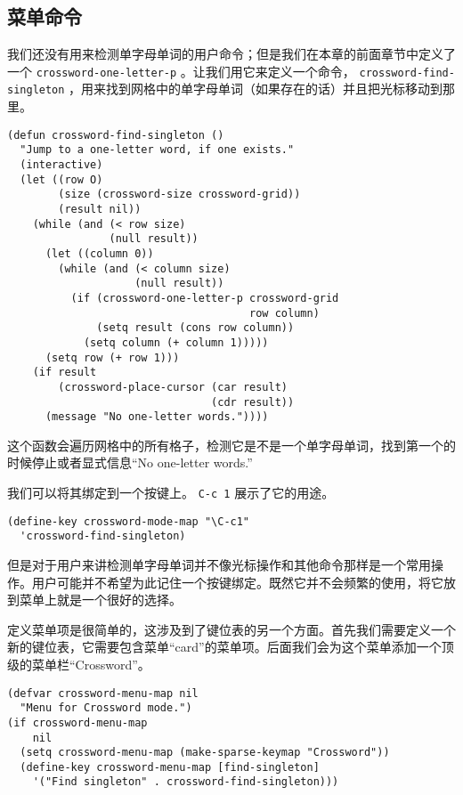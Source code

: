 \subsection{菜单命令}
\label{section:10-Menu-Commands}

我们还没有用来检测单字母单词的用户命令；但是我们在本章的前面章节中定义了一个 \texttt{crossword-one-letter-p} 。让我们用它来定义一个命令， \texttt{crossword-find-singleton} ，用来找到网格中的单字母单词（如果存在的话）并且把光标移动到那里。

\begin{verbatim}
(defun crossword-find-singleton ()
  "Jump to a one-letter word, if one exists."
  (interactive)
  (let ((row O)
        (size (crossword-size crossword-grid))
        (result nil))
    (while (and (< row size)
                (null result))
      (let ((column 0))
        (while (and (< column size)
                    (null result))
          (if (crossword-one-letter-p crossword-grid
                                      row column)
              (setq result (cons row column))
            (setq column (+ column 1)))))
      (setq row (+ row 1)))
    (if result
        (crossword-place-cursor (car result)
                                (cdr result))
      (message "No one-letter words."))))
\end{verbatim}

这个函数会遍历网格中的所有格子，检测它是不是一个单字母单词，找到第一个的时候停止或者显式信息“No one-letter words.”

我们可以将其绑定到一个按键上。 \verb|C-c 1| 展示了它的用途。

\begin{verbatim}
(define-key crossword-mode-map "\C-c1"
  'crossword-find-singleton)
\end{verbatim}

但是对于用户来讲检测单字母单词并不像光标操作和其他命令那样是一个常用操作。用户可能并不希望为此记住一个按键绑定。既然它并不会频繁的使用，将它放到菜单上就是一个很好的选择。

定义菜单项是很简单的，这涉及到了键位表的另一个方面。首先我们需要定义一个新的键位表，它需要包含菜单“card”的菜单项。后面我们会为这个菜单添加一个顶级的菜单栏“Crossword”。

\begin{verbatim}
(defvar crossword-menu-map nil
  "Menu for Crossword mode.")
(if crossword-menu-map
    nil
  (setq crossword-menu-map (make-sparse-keymap "Crossword"))
  (define-key crossword-menu-map [find-singleton]
    '("Find singleton" . crossword-find-singleton)))
\end{verbatim}

